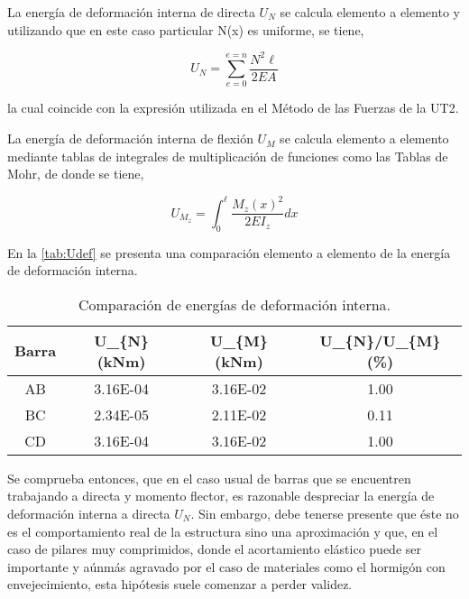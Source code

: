La energía de deformación interna de directa $U_N$ se calcula elemento a elemento y utilizando que en este caso particular N(x) es uniforme, se tiene,

$$
U_N = \sum_{e=0}^{e=n}\frac{N^2\ell}{2EA}  
$$

la cual coincide con la expresión utilizada en el Método de las Fuerzas de la UT2.

La energía de deformación interna de flexión $U_M$ se calcula elemento a elemento mediante tablas de integrales de multiplicación de funciones como las Tablas de Mohr, de donde se tiene, 

$$
U_{M_z} = \int_{0}^\ell \frac{M_z(x)^2}{2EI_z}dx
$$

En la \autoref{tab:Udef} se presenta una comparación elemento a elemento de la energía de deformación interna.

\begin{table}[htb]
	\centering
	\begin{tabular}{cccc}
		\textbf{Barra} & \textbf{U\_\{N\} (kNm)} & \textbf{U\_\{M\} (kNm)} & \textbf{U\_\{N\}/U\_\{M\} (\%)} \\ \toprule
		AB             & 3.16E-04                & 3.16E-02                & 1.00                            \\
		BC             & 2.34E-05                & 2.11E-02                & 0.11                            \\
		CD             & 3.16E-04                & 3.16E-02                & 1.00                           
	\end{tabular}
	\caption{Comparación de energías de deformación interna.}
	\label{tab:Udef}
\end{table}

Se comprueba entonces, que en el caso usual de barras que se encuentren trabajando a directa y momento flector, es razonable despreciar la energía de deformación interna a directa $U_N$. Sin embargo, debe tenerse presente que éste no es el comportamiento real de la estructura sino una aproximación y que, en el caso de pilares muy comprimidos, donde el acortamiento elástico puede ser importante y aúnmás agravado por el caso de materiales como el hormigón con envejecimiento, esta hipótesis suele comenzar a perder validez. 





\clearpage











